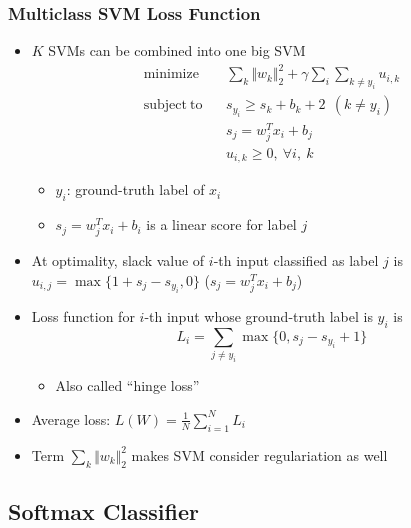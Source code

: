 \subsubsection*{Multiclass SVM Loss Function}
\begin{itemize}
    \item $K$ SVMs can be combined into one big SVM
    \begin{equation}\begin{aligned}
        \mathrm{minimize}~~&~~\sum_k\Vert w_k\Vert_2^2+\gamma\sum_{i}\sum_{k\neq y_i}u_{i,k} \\
        \mathrm{subject~to}~~&~~s_{y_i}\geq s_{k}+b_k+2~~(k\neq y_i)\\
            &~~s_j=w_j^Tx_i+b_j\\
            &~~u_{i,k}\geq 0,~\forall i,~k
    \end{aligned}\end{equation}
    \begin{itemize}
        \item $y_i$: ground-truth label of $x_i$
        \item $s_j=w_j^Tx_i+b_i$ is a linear score for label $j$
    \end{itemize}
    \item At optimality, slack value of $i$-th input classified as label $j$ is $u_{i,j}=\max\{1+s_j-s_{y_i},0\}$ ($s_j=w_j^Tx_i+b_j$)
    \item Loss function for $i$-th input whose ground-truth label is $y_i$ is
    \begin{equation}
        L_i=\sum_{j\neq y_i}\max\{0,s_j-s_{y_i}+1\}
    \end{equation}
    \begin{itemize}
        \item Also called ``hinge loss''
    \end{itemize}
    \begin{figures}
    \end{figures}
    \item Average loss: $L(W)=\frac{1}{N}\sum_{i=1}^NL_i$
    \item Term $\sum_k\Vert w_k\Vert_2^2$ makes SVM consider regulariation as well
\end{itemize}

\subsection{Softmax Classifier}

